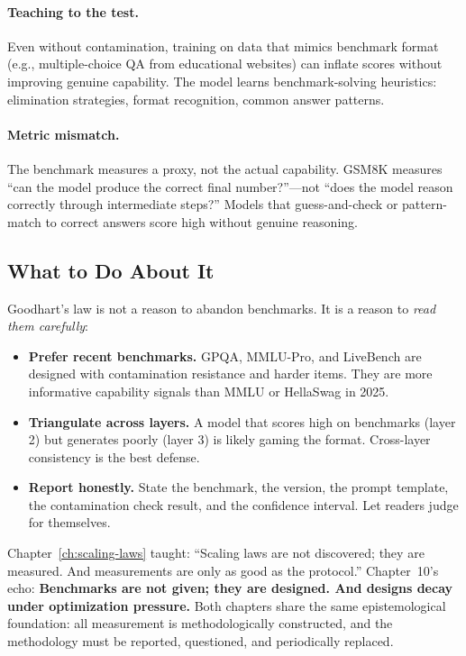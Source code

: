\paragraph{Teaching to the test.} Even without contamination, training on data that mimics benchmark format (e.g., multiple-choice QA from educational websites) can inflate scores without improving genuine capability. The model learns benchmark-solving heuristics: elimination strategies, format recognition, common answer patterns.

\paragraph{Metric mismatch.} The benchmark measures a proxy, not the actual capability. GSM8K measures ``can the model produce the correct final number?''---not ``does the model reason correctly through intermediate steps?'' Models that guess-and-check or pattern-match to correct answers score high without genuine reasoning.

\subsection{What to Do About It}

Goodhart's law is not a reason to abandon benchmarks. It is a reason to \emph{read them carefully}:

\begin{itemize}[nosep]
  \item \textbf{Prefer recent benchmarks.} GPQA, MMLU-Pro, and LiveBench are designed with contamination resistance and harder items. They are more informative capability signals than MMLU or HellaSwag in 2025.
  \item \textbf{Triangulate across layers.} A model that scores high on benchmarks (layer 2) but generates poorly (layer 3) is likely gaming the format. Cross-layer consistency is the best defense.
  \item \textbf{Report honestly.} State the benchmark, the version, the prompt template, the contamination check result, and the confidence interval. Let readers judge for themselves.
\end{itemize}

\begin{tcolorbox}[colback=gray!8, colframe=gray!50]
\small
Chapter~\ref{ch:scaling-laws} taught: ``Scaling laws are not discovered; they are measured. And measurements are only as good as the protocol.'' Chapter~10's echo: \textbf{Benchmarks are not given; they are designed. And designs decay under optimization pressure.} Both chapters share the same epistemological foundation: all measurement is methodologically constructed, and the methodology must be reported, questioned, and periodically replaced.
\end{tcolorbox}

